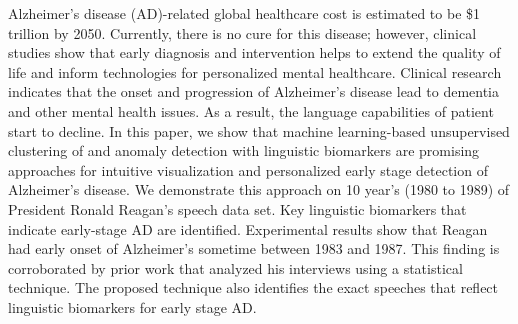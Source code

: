 Alzheimer's disease (AD)-related global healthcare cost is estimated to be \$1 trillion by 2050. Currently, there is no cure for this disease; however, clinical studies show that early diagnosis and intervention helps to extend the quality of life and inform technologies for personalized mental healthcare. Clinical research indicates that the onset and progression of Alzheimer's disease lead to dementia and other mental health issues. As a result, the language capabilities of patient start to decline. In this paper, we show that machine learning-based unsupervised clustering of and anomaly detection with linguistic biomarkers are promising approaches for intuitive visualization and personalized early stage detection of Alzheimer's disease. We demonstrate this approach on 10 year's (1980 to 1989) of President Ronald Reagan's speech data set. Key linguistic biomarkers that indicate early-stage AD are identified. Experimental results show that Reagan had early onset of Alzheimer's sometime between 1983 and 1987. This finding is corroborated by prior work that analyzed his interviews using a statistical technique. The proposed technique also identifies the exact speeches that reflect linguistic biomarkers for early stage AD.
